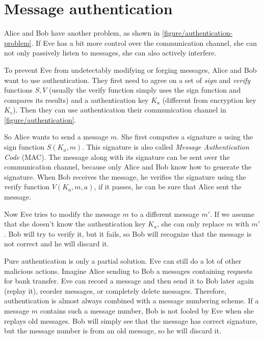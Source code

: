 \section{Message authentication}
\label{toc/message-authentication}




Alice and Bob have another problem, as shown in \autoref{figure/authentication-problem}. If Eve has a bit more control over the communication channel, she can not only passively listen to messages, she can also actively interfere.

To prevent Eve from undetectably modifying or forging messages, Alice and Bob want to use authentication. They first need to agree on a set of \textit{sign} and \textit{verify} functions $S, V$ (usually the verify function simply uses the sign function and compares its results) and a authentication key $K_a$ (different from encryption key $K_e$). Then they can use authentication their communication channel in \autoref{figure/authentication}.

So Alice wants to send a message $m$. She first computes a signature $a$ using the sign function $S(K_a, m)$. This signature is also called \textit{Message Authentication Code} (MAC). The message along with its signature can be sent over the communication channel, because only Alice and Bob know how to generate the signature. When Bob receives the message, he verifies the signature using the verify function $V(K_a, m, a)$, if it passes, he can be sure that Alice sent the message.

Now Eve tries to modify the message $m$ to a different message $m'$. If we assume that she doesn't know the authentication key $K_a$, she can only replace $m$ with $m'$. Bob will try to verify it, but it fails, so Bob will recognize that the message is not correct and he will discard it.

Pure authentication is only a partial solution. Eve can still do a lot of other malicious actions. Imagine Alice sending to Bob a messages containing requests for bank transfer. Eve can record a message and then send it to Bob later again (replay it), reorder messages, or completely delete messages. Therefore, authentication is almost always combined with a message numbering scheme. If a message $m$ contains such a message number, Bob is not fooled by Eve when she replays old messages. Bob will simply see that the message has correct signature, but the message number is from an old message, so he will discard it.

